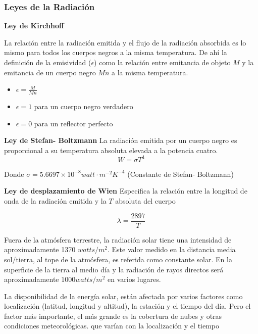 \subsubsection{Leyes de la Radiación}

\textbf{Ley de Kirchhoff}

La relación entre la radiación emitida y el flujo de la radiación absorbida es lo mismo para todos los cuerpos negros a la misma temperatura. De ahí la definición de la emisividad ($\epsilon$)
como la relación entre emitancia de objeto $M$ y la emitancia de un cuerpo negro $Mn$ a la misma temperatura.

\begin{itemize}
    \item $\epsilon=\frac{M}{Mn}$
    \item $\epsilon=1$ para un cuerpo negro verdadero
    \item $\epsilon=0$ para un reflector perfecto
\end{itemize}

\textbf{Ley de Stefan- Boltzmann} La radiación emitida por un cuerpo negro es proporcional a su temperatura absoluta elevada
a la potencia cuatro.
\begin{equation}
    W=\sigma T^4
\end{equation}

Donde $\sigma=5.6697\times 10^{-8} watt\cdot m^{-2}K^{-4}$ (Constante de Stefan- Boltzmann)

\textbf{Ley de desplazamiento de Wien} Especifica la relación entre la longitud de onda de la radiación emitida y la $T$ absoluta del cuerpo

\begin{equation}
    \lambda=\frac{2897}{T}
\end{equation}


Fuera de la atmósfera terrestre, la radiación solar tiene una intensidad de aproximadamente 1370 $watts/m^2$. Este valor medido en la distancia media sol/tierra, al tope de la atmósfera, es referida como constante solar. En la superficie de la tierra al medio día y la radiación de rayos directos será aproximadamente $1000 watts/m^2$ en varios lugares.

La disponibilidad de la energía solar, están afectada por varios factores como localización (latitud, longitud y altitud), la estación y el tiempo del día. Pero el factor más importante, el más grande es la cobertura de nubes y otras condiciones meteorológicas.
que varían con la localización y el tiempo

